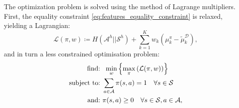 \documentclass[letterpaper]{article}
\begin{document}
The optimization problem is solved using the method of Lagrange multipliers. First, the equality constraint \eqref{eq:features_equality_constraint} is relaxed, yielding a Lagrangian:
\begin{equation}
\label{eq:partial_lagrangian}
\mathcal{L}(\pi,w)\coloneqq H(\mathcal{A}^h||\mathcal{S}^h) + \sum_{k=1}^Kw_k(\mu^{\pi}_k-\widetilde{\mu}^{\mathcal{D}}_k),
\end{equation}
and in turn a less constrained optimisation problem:
\begin{align}
\hbox{find:}\,\,&\,\,\min_{w}\left\{\max_\pi\left(\mathcal{L}(\pi,w)\right)\right\}\label{eq:partial_dual_obj}\\
\hbox{subject to:}\,\,&\sum_{a\in\mathcal{A}}\pi(s,a)  = 1\quad\forall s\in\mathcal{S}\label{eq:dual_constraint_1}\\
\hbox{and:}\,\,&\pi(s,a) \geq 0\quad\forall s\in\mathcal{S},a\in\mathcal{A},\label{eq:dual_constraint_2}
\end{align}
\end{document}
